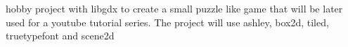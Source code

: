 hobby project with libgdx to create a small puzzle like game that will be later used for a youtube tutorial series. The project will use ashley, box2d, tiled, truetypefont and scene2d 